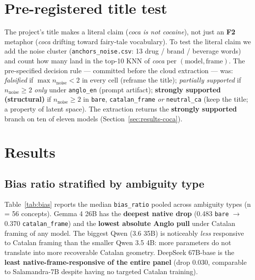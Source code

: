 \documentclass[10pt,twocolumn,a4paper]{article}
\newcommand{\code}[1]{\texttt{\small #1}}
\newcommand{\concept}[1]{\emph{#1}}
\newcommand{\Ftwo}{\textbf{F2}}
\begin{document}
\section{Pre-registered title test}\label{sec:title}

The project's title makes a literal claim (\emph{coca is not cocaine}), not
just an \Ftwo{} metaphor (\concept{coca} drifting toward fairy-tale
vocabulary). To test the literal claim we add the noise cluster
(\code{anchors\_noise.csv}: 13 drug / brand / beverage words) and count how
many land in the top-10 KNN of \concept{coca} per $(\text{model},
\text{frame})$. The pre-specified decision rule --- committed before the cloud
extraction --- was: \emph{falsified} if $\max n_{\text{noise}} < 2$ in every
cell (reframe the title); \emph{partially supported} if $n_{\text{noise}} \geq
2$ \emph{only} under \code{anglo\_en} (prompt artifact); \textbf{strongly
supported (structural)} if $n_{\text{noise}} \geq 2$ in \code{bare},
\code{catalan\_frame} \emph{or} \code{neutral\_ca} (keep the title; a property
of latent space). The extraction returns the \textbf{strongly supported}
branch on ten of eleven models (Section~\ref{sec:results-coca}).

\section{Results}\label{sec:results}

\subsection{Bias ratio stratified by ambiguity type}

Table~\ref{tab:bias} reports the median \code{bias\_ratio} pooled across
ambiguity types (n = 56 concepts). Gemma 4 26B has the \textbf{deepest native
drop} (0.483 \code{bare} $\rightarrow$ 0.370 \code{catalan\_frame}) and the
\textbf{lowest absolute Anglo pull} under Catalan framing of any model. The
biggest Qwen (3.6 35B) is noticeably \emph{less} responsive to Catalan framing
than the smaller Qwen 3.5 4B: more parameters do not translate into more
recoverable Catalan geometry. DeepSeek 67B-base is the \textbf{least
native-frame-responsive of the entire panel} (drop 0.030, comparable to
Salamandra-7B despite having no targeted Catalan training).
\end{document}

